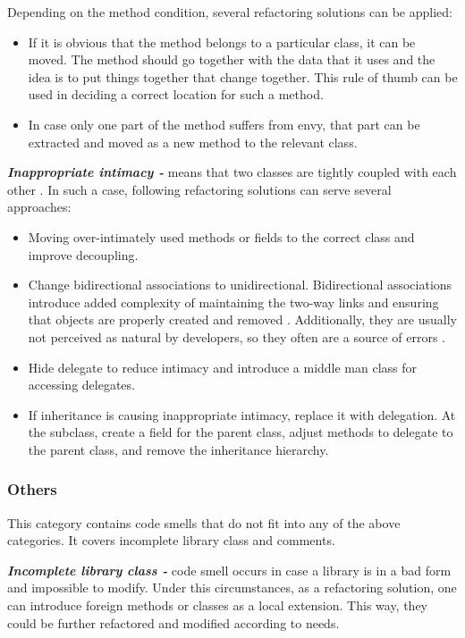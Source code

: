 Depending on the method condition, several refactoring solutions can be applied:

\begin{itemize}
\item If it is obvious that the method belongs to a particular class, it can be moved. The method should go together with the data that it uses and the idea is to put things together that change together. This rule of thumb can be used in deciding a correct location for such a method.
\item In case only one part of the method suffers from envy, that part can be extracted and moved as a new method to the relevant class.
\end{itemize}
 
\textit{\textbf{Inappropriate intimacy -}} means that two classes are tightly coupled with each other \cite{mantylaTaxonomy}. In such a case, following refactoring solutions can serve several approaches:

\begin{itemize}
\item Moving over-intimately used methods or fields to the correct class and improve decoupling.
\item Change bidirectional associations to unidirectional. Bidirectional associations introduce added complexity of maintaining the two-way links and ensuring that objects are properly created and removed \cite{fowlerRefactor}. Additionally, they are usually not perceived as natural by developers, so they often are a source of errors \cite{fowlerRefactor}.
\item Hide delegate to reduce intimacy and introduce a middle man class for accessing delegates.
\item If inheritance is causing inappropriate intimacy, replace it with delegation. At the subclass, create a field for the parent class, adjust methods to delegate to the parent class, and remove the inheritance hierarchy.
\end{itemize}

\subsubsection*{Others}
This category contains code smells that do not fit into any of the above categories. It covers incomplete library class and comments.

\textit{\textbf{Incomplete library class -}} code smell occurs in case a library is in a bad form and impossible to modify. Under this circumstances, as a refactoring solution, one can introduce foreign methods or classes as a local extension. This way, they could be further refactored and modified according to needs. 
 

